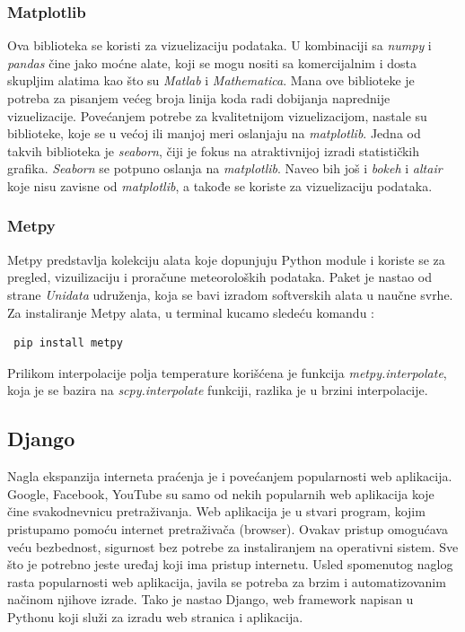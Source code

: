 \documentclass[12pt]{article}
\begin{document}
\subsubsection{Matplotlib}
Ova biblioteka se koristi za vizuelizaciju podataka. U kombinaciji sa \textsl{numpy} i \textsl{pandas} čine jako moćne alate, koji se mogu nositi sa komercijalnim i dosta skupljim alatima kao što su \textsl{Matlab} i \textsl{Mathematica}. Mana ove biblioteke je potreba za pisanjem većeg broja linija koda radi dobijanja naprednije vizuelizacije. 
Povećanjem potrebe za kvalitetnijom vizuelizacijom, nastale su biblioteke, koje se u većoj ili manjoj meri oslanjaju na \textsl{matplotlib}. Jedna od takvih biblioteka je \textsl{seaborn}, čiji je fokus na atraktivnijoj izradi statističkih grafika. \textsl{Seaborn} se potpuno oslanja na \textsl{matplotlib}. Naveo bih još i \textsl{bokeh} i \textsl{altair} koje nisu zavisne od \textsl{matplotlib}, a takođe se koriste za vizuelizaciju podataka.
\subsubsection{Metpy}
Metpy predstavlja kolekciju alata koje dopunjuju Python module i koriste se za pregled, vizuilizaciju i proračune meteoroloških podataka. Paket je nastao od strane \textsl{Unidata} udruženja, koja se bavi izradom softverskih alata u naučne svrhe. Za instaliranje Metpy alata, u terminal kucamo sledeću komandu :
\begin{lstlisting}
 pip install metpy
\end{lstlisting}
Prilikom interpolacije polja temperature korišćena je funkcija\textit{ metpy.interpolate}, koja je se bazira na \textit{scpy.interpolate} funkciji, razlika je u brzini interpolacije. 

\newpage

\subsection{Django}

Nagla ekspanzija interneta praćenja je i povećanjem popularnosti web aplikacija. Google, Facebook, YouTube su samo od nekih popularnih web aplikacija koje čine svakodnevnicu pretraživanja. Web aplikacija je u stvari program, kojim pristupamo pomoću internet pretraživača (browser). Ovakav pristup omogućava veću bezbednost, sigurnost bez potrebe za instaliranjem na operativni sistem. Sve što je potrebno jeste uređaj koji ima pristup internetu. 
Usled spomenutog naglog rasta popularnosti web aplikacija, javila se potreba za brzim i automatizovanim načinom njihove izrade. Tako je nastao Django, web framework napisan u Pythonu koji služi za izradu web stranica i aplikacija. 
\end{document}
